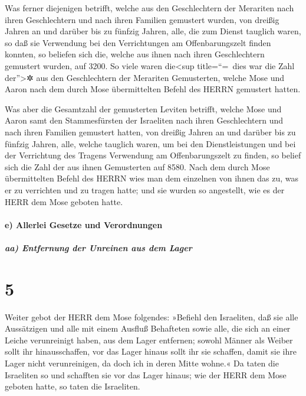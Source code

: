 Was ferner diejenigen betrifft, welche aus den
Geschlechtern der Merariten nach ihren Geschlechtern und nach ihren
Familien gemustert wurden, von dreißig Jahren an und
darüber bis zu fünfzig Jahren, alle, die zum Dienst tauglich waren, so
daß sie Verwendung bei den Verrichtungen am Offenbarungszelt finden
konnten, so beliefen sich die, welche aus ihnen nach
ihren Geschlechtern gemustert wurden, auf 3200. So viele
waren die\textless sup title=``=~dies war die Zahl der''\textgreater✲
aus den Geschlechtern der Merariten Gemusterten, welche Mose und Aaron
nach dem durch Mose übermittelten Befehl des HERRN gemustert hatten.

Was aber die Gesamtzahl der gemusterten Leviten betrifft,
welche Mose und Aaron samt den Stammesfürsten der Israeliten nach ihren
Geschlechtern und nach ihren Familien gemustert hatten,
von dreißig Jahren an und darüber bis zu fünfzig Jahren,
alle, welche tauglich waren, um bei den Dienstleistungen und bei der
Verrichtung des Tragens Verwendung am Offenbarungszelt zu finden,
so belief sich die Zahl der aus ihnen Gemusterten auf
8580. Nach dem durch Mose übermittelten Befehl des HERRN
wies man dem einzelnen von ihnen das zu, was er zu verrichten und zu
tragen hatte; und sie wurden so angestellt, wie es der HERR dem Mose
geboten hatte.

\hypertarget{e-allerlei-gesetze-und-verordnungen}{%
\paragraph{e) Allerlei Gesetze und
Verordnungen}\label{e-allerlei-gesetze-und-verordnungen}}

\hypertarget{aa-entfernung-der-unreinen-aus-dem-lager}{%
\subparagraph{aa) Entfernung der Unreinen aus dem
Lager}\label{aa-entfernung-der-unreinen-aus-dem-lager}}

\hypertarget{section-4}{%
\section{5}\label{section-4}}

Weiter gebot der HERR dem Mose folgendes:
»Befiehl den Israeliten, daß sie alle Aussätzigen und alle
mit einem Ausfluß Behafteten sowie alle, die sich an einer Leiche
verunreinigt haben, aus dem Lager entfernen; sowohl Männer
als Weiber sollt ihr hinausschaffen, vor das Lager hinaus sollt ihr sie
schaffen, damit sie ihre Lager nicht verunreinigen, da doch ich in deren
Mitte wohne.« Da taten die Israeliten so und schafften sie
vor das Lager hinaus; wie der HERR dem Mose geboten hatte, so taten die
Israeliten.

